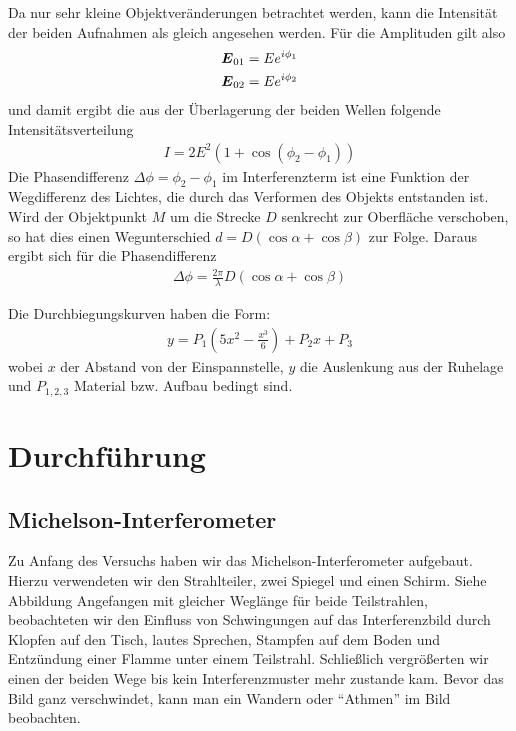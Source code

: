 \documentclass[12pt]{article}
\renewcommand*\vec[1]{{\mbox{\boldmath\ensuremath{#1}}}}
\begin{document}
Da nur sehr kleine Objektveränderungen betrachtet werden, kann die Intensität der beiden
Aufnahmen als gleich angesehen werden. Für die Amplituden gilt also
\begin{align*}
 \vec E_{01} &= E e^{i\phi_1} \\
 \vec E_{02} &= E e^{i\phi_2}
\end{align*}
und damit ergibt die aus der Überlagerung der beiden Wellen folgende Intensitätsverteilung
\begin{align}
 I = 2E^2(1+\cos{(\phi_2 - \phi_1)})
\end{align}
Die Phasendifferenz $\Delta\phi = \phi_2 - \phi_1$ im Interferenzterm ist eine Funktion der Wegdifferenz des
Lichtes, die durch das Verformen des Objekts entstanden ist. Wird der Objektpunkt $M$ um
die Strecke $D$ senkrecht zur Oberfläche verschoben, so hat dies einen Wegunterschied $d = D(\cos{\alpha} + \cos{\beta})$ zur Folge.
Daraus ergibt sich für die Phasendifferenz
\begin{align}
 \Delta\phi = \frac{2\pi}{\lambda} D(\cos{\alpha} + \cos{\beta})
\end{align}

Die Durchbiegungskurven haben die Form:
\begin{align}
 y = P_1 \left(5 x^2 - \frac{x^3}{6}\right) + P_2 x + P_3
\end{align}
wobei $x$ der Abstand von der Einspannstelle, $y$ die Auslenkung aus der Ruhelage und $P_{1,2,3}$ Material bzw. Aufbau bedingt sind.

\section{Durchführung}
\subsection{Michelson-Interferometer}
Zu Anfang des Versuchs haben wir das Michelson-Interferometer aufgebaut. Hierzu verwendeten wir den Strahlteiler, zwei Spiegel und einen Schirm. Siehe
Abbildung %
Angefangen mit gleicher Weglänge für beide Teilstrahlen, beobachteten wir den Einfluss von Schwingungen auf das Interferenzbild durch Klopfen auf den Tisch,
lautes Sprechen, Stampfen auf dem Boden und Entzündung einer Flamme unter einem Teilstrahl. Schließlich vergrößerten wir einen der beiden Wege bis kein 
Interferenzmuster mehr zustande kam. Bevor das Bild ganz verschwindet, kann man ein Wandern oder ``Athmen'' im Bild beobachten.
\end{document}
